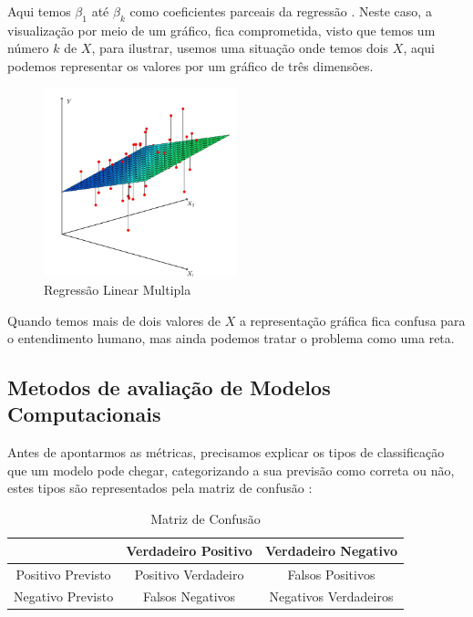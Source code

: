 \documentclass[
    12pt,               %
    openright,          %
    oneside,            %
    a4paper,            %
    english,            %
    brazil              %
    ]{abntex2}
\begin{document}
Aqui temos $\beta_1$ até $\beta_k$ como coeficientes parceais da regressão \cite{modelos_regressao_linear}. 
Neste caso, a visualização por meio de um gráfico, fica comprometida, visto que temos um número $k$ de 
$X$, para ilustrar, usemos uma situação onde temos dois $X$, aqui podemos representar os valores por 
um gráfico de três dimensões.

\begin{figure}[H]
    \centering
    \caption{\label{Regressão Linear Multipla}Regressão Linear Multipla}
    \includegraphics[width=0.50\textwidth]{../Imgs/reg_linear_multipla.png}
\end{figure}

Quando temos mais de dois valores de $X$ a representação gráfica fica confusa para o entendimento humano,
mas ainda podemos tratar o problema como uma reta.

\subsection{Metodos de avaliação de Modelos Computacionais}

Antes de apontarmos as métricas, precisamos explicar os tipos de classificação que um modelo pode chegar,
categorizando a sua previsão como correta ou não, estes tipos são representados pela matriz de confusão
\cite{acuracia_matriz}:

\begin{table}[H]
    \centering
    \caption{\label{Matriz de Confusão}Matriz de Confusão}
    \begin{tabular}{|c|c|c|}
    \hline
                      & Verdadeiro Positivo & Verdadeiro Negativo   \\ \hline
    Positivo Previsto & Positivo Verdadeiro & Falsos Positivos      \\ \hline
    Negativo Previsto & Falsos Negativos    & Negativos Verdadeiros \\ \hline
    \end{tabular}
\end{table}
\end{document}
